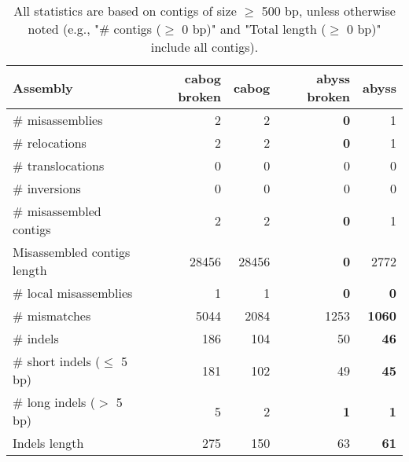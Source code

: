 \documentclass[12pt,a4paper]{article}
\begin{document}
\begin{table}[ht]
\begin{center}
\caption{All statistics are based on contigs of size $\geq$ 500 bp, unless otherwise noted (e.g., "\# contigs ($\geq$ 0 bp)" and "Total length ($\geq$ 0 bp)" include all contigs).}
\begin{tabular}{|l*{4}{|r}|}
\hline
Assembly & cabog broken & cabog & abyss broken & abyss \\ \hline
\# misassemblies & 2 & 2 & {\bf 0} & 1 \\ \hline
\hspace{5mm}\# relocations & 2 & 2 & {\bf 0} & 1 \\ \hline
\hspace{5mm}\# translocations & 0 & 0 & 0 & 0 \\ \hline
\hspace{5mm}\# inversions & 0 & 0 & 0 & 0 \\ \hline
\# misassembled contigs & 2 & 2 & {\bf 0} & 1 \\ \hline
Misassembled contigs length & 28456 & 28456 & {\bf 0} & 2772 \\ \hline
\# local misassemblies & 1 & 1 & {\bf 0} & {\bf 0} \\ \hline
\# mismatches & 5044 & 2084 & 1253 & {\bf 1060} \\ \hline
\# indels & 186 & 104 & 50 & {\bf 46} \\ \hline
\hspace{5mm}\# short indels ($\leq$ 5 bp) & 181 & 102 & 49 & {\bf 45} \\ \hline
\hspace{5mm}\# long indels ($>$ 5 bp) & 5 & 2 & {\bf 1} & {\bf 1} \\ \hline
Indels length & 275 & 150 & 63 & {\bf 61} \\ \hline
\end{tabular}
\end{center}
\end{table}
\end{document}
